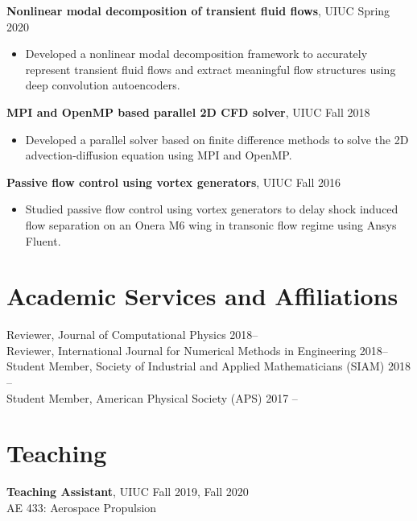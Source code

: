 \documentclass[margin]{res}
\begin{document}
\begin{resume}
{\bf Nonlinear modal decomposition of transient fluid flows}, UIUC \hfill Spring 2020
\begin{itemize}
\item Developed a nonlinear modal decomposition framework to accurately represent transient fluid flows and extract meaningful flow structures using deep convolution autoencoders.
\end{itemize}

{\bf MPI and OpenMP based parallel 2D CFD solver}, UIUC \hfill Fall 2018
\begin{itemize}
\item Developed a parallel solver based on finite difference methods to solve the 2D advection-diffusion equation using MPI and OpenMP.
\end{itemize}

{\bf Passive flow control using vortex generators}, UIUC \hfill Fall 2016
\begin{itemize}
\item Studied passive flow control using vortex generators to delay shock induced flow separation on an Onera M6 wing in transonic flow regime using Ansys Fluent.
\end{itemize}

\section{\large Academic Services and Affiliations}		 
Reviewer, Journal of Computational Physics \hfill 2018--\vspace{0.1cm}\\
Reviewer, International Journal for Numerical Methods in Engineering \hfill 2018--\vspace{0.1cm}\\
Student Member, Society of Industrial and Applied Mathematicians (SIAM) \hfill 2018 --\vspace{0.1cm}\\
Student Member, American Physical Society (APS) \hfill 2017 --
		 
\section{\large Teaching}
{\bf Teaching Assistant}, UIUC \hfill Fall 2019, Fall 2020 \\
AE 433: Aerospace Propulsion
\vspace{-0.1cm}


\end{resume}
\end{document}
